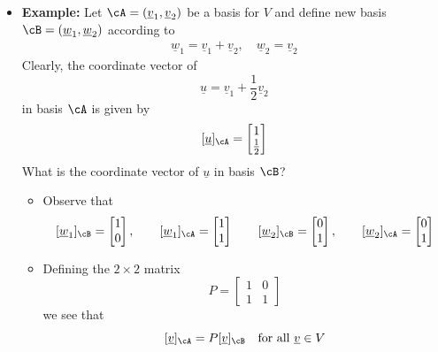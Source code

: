 \documentclass[11pt,twoside]{report}
\newcommand{\vecnot}{\underline}
\begin{document}
\begin{itemize}
\item \textbf{Example:}  Let $\cA = (\vecnot{v}_1, \vecnot{v}_2)$ be a basis for $V$ and  define new basis $\cB = (\vecnot{w}_1, \vecnot{w}_2)$ according to 
\begin{align*}
\vecnot{w}_1 = \vecnot{v}_1+ \vecnot{v}_2, \quad \vecnot{w}_2 = \vecnot{v}_2
\end{align*}
Clearly, the coordinate vector of 
\[
\vecnot{u}= \vecnot{v}_1+  \frac{1}{2} \vecnot{v}_2%
\]
in basis $\cA$ is given by 
\[
 [\vecnot{u}]_{\cA} = \begin{bmatrix} 1 \\  \tfrac{1}{2} \end{bmatrix} 
 \]
 What is the coordinate vector of $\vecnot{u}$ in basis $\cB$?


\begin{itemize}
\item Observe that
\[
 [\vecnot{w}_1]_{\cB}  = \begin{bmatrix} 1 \\  0 \end{bmatrix} , \qquad   [\vecnot{w}_1]_{\cA}  = \begin{bmatrix} 1 \\  1 \end{bmatrix}  \qquad   [\vecnot{w}_2]_{\cB}  = \begin{bmatrix} 0 \\  1 \end{bmatrix} , \qquad   [\vecnot{w}_2]_{\cA}  = \begin{bmatrix} 0  \\  1 \end{bmatrix}  
\]
\item Defining the $2 \times 2$ matrix 
\[
P = \begin{bmatrix} 1 & 0 \\ 1 & 1 \end{bmatrix}  
\]
we see that
\[
 [\vecnot{v}]_{\cA}  = P [\vecnot{v}]_{\cB}  \quad \text{for all $\vecnot{v} \in V$}
\]


\end{itemize}
\end{itemize}
\end{document}
